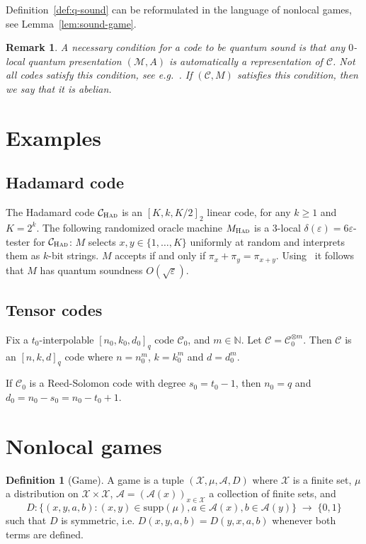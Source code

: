 \documentclass[11pt]{article}
\newtheorem{remark}[theorem]{Remark}
\theoremstyle{definition}
\newtheorem{definition}[theorem]{Definition}
\newcommand{\code}{\mathcal{C}}
\newcommand{\N}{\ensuremath{\mathbb{N}}}
\newcommand{\mA}{\ensuremath{\mathcal{A}}}
\newcommand{\mC}{\ensuremath{\mathcal{C}}}
\newcommand{\mM}{\ensuremath{\mathcal{M}}}
\newcommand{\mX}{\ensuremath{\mathcal{X}}}
\newcommand{\had}{\textsc{Had}}
\newcommand{\eps}{\varepsilon}
\begin{document}
Definition~\ref{def:q-sound} can be reformulated in the language of nonlocal games, see Lemma~\ref{lem:sound-game}. 

\begin{remark}
A necessary condition for a code to be quantum sound is that any $0$-local quantum presentation $(\mM,A)$ is automatically a representation of $\mC$. Not all codes satisfy this condition, see e.g.~\cite[Example 2.16]{slofstra}. If $(\mC,M)$ satisfies this condition, then we say that it is \emph{abelian}.
\end{remark}


		
		
\section{Examples}

\subsection{Hadamard code}

The Hadamard code $\code_\had$ is an $[K,k,K/2]_2$ linear code, for any $k\geq 1$ and $K=2^k$. The following randomized oracle machine $M_\had$ is a $3$-local $\delta(\eps)=6\eps$-tester for $\code_\had$: $M$ selects $x,y\in\{1,\ldots,K\}$ uniformly at random and interprets them as $k$-bit strings. $M$ accepts if and only if $\pi_x + \pi_y  = \pi_{x+y}$. Using~\cite[Theorem 10]{natarajan2016robust} it follows that $M$ has quantum soundness $O(\sqrt{\eps})$. 

\subsection{Tensor codes}

Fix a $t_0$-interpolable $[n_0,k_0,d_0]_q$ code $\code_0$, and $m\in \N$. Let $\code = \code_0^{\otimes m}$. Then $\code$ is an $[n,k,d]_q$ code where $n=n_0^m$, $k=k_0^m$ and $d=d_0^m$. 


If $\code_0$ is a Reed-Solomon code with degree $s_0=t_0-1$, then $n_0=q$ and $d_0=n_0-s_0=n_0-t_0+1$.


\section{Nonlocal games}



\begin{definition}[Game]
A game is a tuple $(\mX,\mu,\mA,D)$ where $\mX$ is a finite set, $\mu$ a distribution on $\mX\times \mX$, $\mA=(\mA(x))_{x\in\mX}$ a collection of finite sets, and 
\[ D: \big\{ (x,y,a,b) : (x,y)\in\text{supp}(\mu),a\in\mA(x),b\in\mA(y)\big\} \;\to\;\{0,1\}\]
such that $D$ is symmetric, i.e. $D(x,y,a,b)=D(y,x,a,b)$ whenever both terms are defined. 
\end{definition}
		
\end{document}

